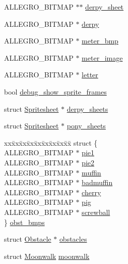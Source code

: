 \begin{DoxyCompactItemize}
A\-L\-L\-E\-G\-R\-O\-\_\-\-B\-I\-T\-M\-A\-P $\ast$$\ast$ \hyperlink{structLevel_a0e02f3a5674a2ad3c23de22b6a4ed044}{derpy\-\_\-sheet}
\item 
A\-L\-L\-E\-G\-R\-O\-\_\-\-B\-I\-T\-M\-A\-P $\ast$ \hyperlink{structLevel_ae33832497116b7a0c184959bbde21ee5}{derpy}
\item 
A\-L\-L\-E\-G\-R\-O\-\_\-\-B\-I\-T\-M\-A\-P $\ast$ \hyperlink{structLevel_a4e78a54cbf3cdcc804f65acb03cef0b3}{meter\-\_\-bmp}
\item 
A\-L\-L\-E\-G\-R\-O\-\_\-\-B\-I\-T\-M\-A\-P $\ast$ \hyperlink{structLevel_a371c97dfa3d564a19648cb1b72edbf60}{meter\-\_\-image}
\item 
A\-L\-L\-E\-G\-R\-O\-\_\-\-B\-I\-T\-M\-A\-P $\ast$ \hyperlink{structLevel_af1b1699478b4633d76c01ea09e666df4}{letter}
\item 
bool \hyperlink{structLevel_a1df786b74cff642434ea6587e6141b4d}{debug\-\_\-show\-\_\-sprite\-\_\-frames}
\item 
struct \hyperlink{structSpritesheet}{Spritesheet} $\ast$ \hyperlink{structLevel_aad19c0af5ac43ceb72df311d89bd4297}{derpy\-\_\-sheets}
\item 
struct \hyperlink{structSpritesheet}{Spritesheet} $\ast$ \hyperlink{structLevel_a591b830752cc796a306e96166f736e3b}{pony\-\_\-sheets}
\item 
\begin{tabbing}
xx\=xx\=xx\=xx\=xx\=xx\=xx\=xx\=xx\=\kill
struct \{\\
\>ALLEGRO\_BITMAP $\ast$ \hyperlink{structLevel_acf777bae2b7533d8eda0d9766ea402df}{pie1}\\
\>ALLEGRO\_BITMAP $\ast$ \hyperlink{structLevel_a6b817f8a028cbb01ea9d7e1e6dbcdede}{pie2}\\
\>ALLEGRO\_BITMAP $\ast$ \hyperlink{structLevel_ad4d4190d232b674d4211f3355a9b7a93}{muffin}\\
\>ALLEGRO\_BITMAP $\ast$ \hyperlink{structLevel_addc469e6a9843c509fc640a4e625fa50}{badmuffin}\\
\>ALLEGRO\_BITMAP $\ast$ \hyperlink{structLevel_a6f99b0cb9d6bbba1fd903bc304205270}{cherry}\\
\>ALLEGRO\_BITMAP $\ast$ \hyperlink{structLevel_aacde4816ff59c4d9ab6f403758630b8f}{pig}\\
\>ALLEGRO\_BITMAP $\ast$ \hyperlink{structLevel_a40c90c0712efb86cd76d0dcae74f2cbd}{screwball}\\
\} \hyperlink{structLevel_aeb52cb0b931eae0233dd1b50f2c02bf2}{obst\_bmps}\\

\end{tabbing}\item 
struct \hyperlink{structObstacle}{Obstacle} $\ast$ \hyperlink{structLevel_a4b4ac826580c681b588dae8ae0dde418}{obstacles}
\item 
struct \hyperlink{structMoonwalk}{Moonwalk} \hyperlink{structLevel_ab9e39b9ac0f342332e034c59d55d6a07}{moonwalk}
\end{DoxyCompactItemize}



